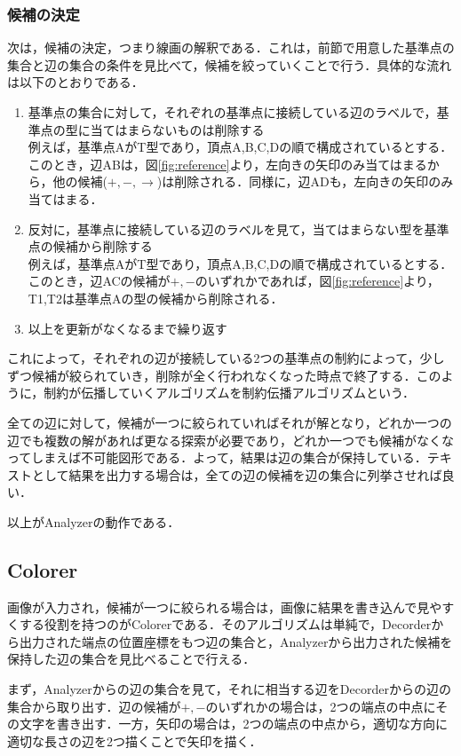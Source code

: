 \documentclass{jarticle}
\begin{document}
\subsubsection{候補の決定}
次は，候補の決定，つまり線画の解釈である．これは，前節で用意した基準点の集合と辺の集合の条件を見比べて，候補を絞っていくことで行う．具体的な流れは以下のとおりである．
\begin{enumerate}
\item 基準点の集合に対して，それぞれの基準点に接続している辺のラベルで，基準点の型に当てはまらないものは削除する\\
	例えば，基準点AがT型であり，頂点A,B,C,Dの順で構成されているとする．このとき，辺ABは，図\ref{fig:reference}より，左向きの矢印のみ当てはまるから，他の候補($+, -, \rightarrow$)は削除される．同様に，辺ADも，左向きの矢印のみ当てはまる．
\item 反対に，基準点に接続している辺のラベルを見て，当てはまらない型を基準点の候補から削除する\\
	例えば，基準点AがT型であり，頂点A,B,C,Dの順で構成されているとする．このとき，辺ACの候補が$+,-$のいずれかであれば，図\ref{fig:reference}より，T1,T2は基準点Aの型の候補から削除される．
\item 以上を更新がなくなるまで繰り返す
\end{enumerate}

これによって，それぞれの辺が接続している2つの基準点の制約によって，少しずつ候補が絞られていき，削除が全く行われなくなった時点で終了する．このように，制約が伝播していくアルゴリズムを制約伝播アルゴリズムという．

全ての辺に対して，候補が一つに絞られていればそれが解となり，どれか一つの辺でも複数の解があれば更なる探索が必要であり，どれか一つでも候補がなくなってしまえば不可能図形である．よって，結果は辺の集合が保持している．テキストとして結果を出力する場合は，全ての辺の候補を辺の集合に列挙させれば良い．

以上がAnalyzerの動作である．



\subsection{Colorer}
画像が入力され，候補が一つに絞られる場合は，画像に結果を書き込んで見やすくする役割を持つのがColorerである．そのアルゴリズムは単純で，Decorderから出力された端点の位置座標をもつ辺の集合と，Analyzerから出力された候補を保持した辺の集合を見比べることで行える．

まず，Analyzerからの辺の集合を見て，それに相当する辺をDecorderからの辺の集合から取り出す．辺の候補が$+, -$のいずれかの場合は，2つの端点の中点にその文字を書き出す．一方，矢印の場合は，2つの端点の中点から，適切な方向に適切な長さの辺を2つ描くことで矢印を描く．
\end{document}
